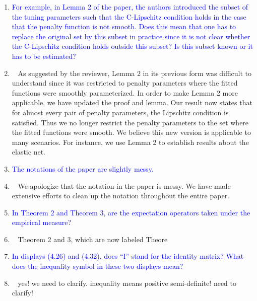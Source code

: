 \documentclass[]{article}
\newcommand{\point}[1]{\item \textcolor{blue}{#1}}
\newcommand{\reply}{\item[]\ }
\begin{document}
\begin{enumerate}
{		}
		
		\point{
			For example, in Lemma 2 of the paper, the authors introduced the subset of the tuning parameters such that the C-Lipschitz condition holds in the case that the penalty function is not smooth.
			Does this mean that one has to replace the original set by this subset in practice since it is not clear whether the C-Lipschitz condition holds outside this subset?
			Is this subset known or it has to be estimated?
		}
		\reply{
		As suggested by the reviewer, Lemma 2 in its previous form was difficult to understand since it was restricted to penalty parameters where the fitted functions were smoothly parameterized.
		In order to make Lemma 2 more applicable, we have updated the proof and lemma.
		Our result now states that for almost every pair of penalty parameters, the Lipschitz condition is satisfied.
		Thus we no longer restrict the penalty parameters to the set where the fitted functions were smooth.
		We believe this new version is applicable to many scenarios.
		For instance, we use Lemma 2 to establish results about the elastic net.
		}
		
		\point{
		The notations of the paper are slightly messy.
		}
	
		\reply{
			We apologize that the notation in the paper is messy.
			We have made extensive efforts to clean up the notation throughout the entire paper.
		}
	
		\point{
			In Theorem 2 and Theorem 3, are the expectation operators taken under the empirical measure?
		}
		\reply{
			Theorem 2 and 3, which are now labeled Theore
		}
		\point{
			In displays (4.26) and (4.32), does “I” stand for the identity matrix? What does the inequality symbol in these two displays mean?
		}
	
		\reply{
			yes! we need to clarify.
			inequality means positive semi-definite! need to clarify!
		}
	\end{enumerate} 
	
\end{document}
